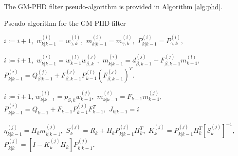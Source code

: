 The GM-PHD filter pseudo-algorithm is provided in Algorithm \ref{alg:phd}.
\begin{algorithm}[h]
    \caption{Pseudo-algorithm for the GM-PHD filter}
    \begin{algorithmic}[1]

        \State
            \State $i:= i+1,$
            \State $w_{k|k-1}^{(i)} = w_{\gamma,k}^{(i)},$ \quad
            $m_{k|k-1}^{(i)} = m_{\gamma,k}^{(i)},$ \quad
            $P_{k|k-1}^{(i)} = P_{\gamma,k}^{(i)},$
        \EndFor

                \State $i:=i+1,$
                \State $w_{k|k-1}^{(i)} = w_{k-1}^{(l)} w_{\beta,k}^{(j)},$
                \State $m_{k|k-1}^{(i)} = d_{\beta,k-1}^{(j)} + F_{\beta,k-1}^{(j)} m_{k-1}^{(l)},$
                \State $P_{k|k-1}^{(i)} = Q_{\beta|k-1}^{(j)} + F_{\beta,k-1}^{(j)} P_{k-1}^{(l)} (F_{\beta,k-1}^{(j)})^T.$
            \EndFor
        \EndFor
        \EndProcedure
        \State


            \State $i:=i+1$,
            \State $w_{k|k-1}^{(i)} = p_{S,k} w_{k-1}^{(j)},$
            \State $m_{k|k-1}^{(i)} = F_{k-1} m_{k-1}^{(j)},$
            \State $P_{k|k-1}^{(i)} = Q_{k-1} + F_{k-1} P_{k-1}^{(j)} F_{k-1}^T,$
        \EndFor
        \State $J_{k|k-1} = i$
        \EndProcedure

        \State
            \State $\eta_{k|k-1}^{(j)} = H_k m_{k|k-1}^{(j)},$ \quad
             $S_k^{(j)} = R_k + H_k P_{k|k-1}^{(j)} H_k^T,$
            \State $K_k^{(j)} = P_{k|k-1}^{(j)} H_k^T [S_k^{(j)}]^{-1},$ \quad
             $P_{k|k}^{(j)} = [I - K_k^{(j)} H_k] P_{k|k-1}^{(j)}.$
        \EndFor
        \EndProcedure


\end{algorithmic}
\end{algorithm}

